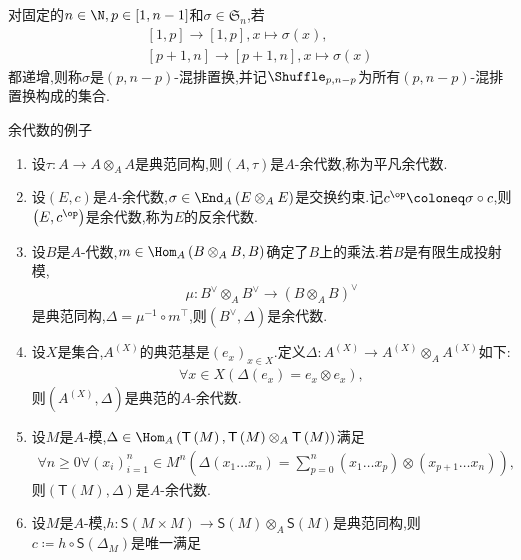 \begin{remark}{}{}
	对固定的$n\in\N,p\in\left[1,n-1\right]$和$\sigma\in\mathfrak{S}_{n}$,若
	\begin{gather*}
		\left[1,p\right]\to\left[1,p\right],x\mapsto\sigma\left(x\right),\\
		\left[p+1,n\right]\to\left[p+1,n\right],x\mapsto\sigma\left(x\right)
	\end{gather*}
	都递增,则称$\sigma$是$\left(p,n-p\right)$-混排置换,并记$\Shuffle_{p,n-p}$为所有$\left(p,n-p\right)$-混排置换构成的集合.
\end{remark}

\begin{example}{余代数的例子}{}
	\begin{enumerate}
		\item 设$\tau:A\to A\otimes_{A}A$是典范同构,则$\left(A,\tau\right)$是$A$-余代数,称为平凡余代数.
		\item 设$\left(E,c\right)$是$A$-余代数,$\sigma\in\End_{A}\left(E\otimes_{A}E\right)$是交换约束.记$c^{\op}\coloneq\sigma\circ c$,则$\left(E,c^{\op}\right)$是余代数,称为$E$的反余代数.
		\item 设$B$是$A$-代数,$m\in\Hom_{A}\left(B\otimes_{A}B,B\right)$确定了$B$上的乘法.若$B$是有限生成投射模,
		\begin{align*}
			\mu:B^{\vee}\otimes_{A}B^{\vee}\to\left(B\otimes_{A}B\right)^{\vee}
		\end{align*}
		是典范同构,$\Delta=\mu^{-1}\circ m^{\top}$,则$\left(B^{\vee},\Delta\right)$是余代数.
		\item 设$X$是集合,$A^{\left(X\right)}$的典范基是$\left(e_{x}\right)_{x\in X}$.定义$\Delta:A^{\left(X\right)}\to A^{\left(X\right)}\otimes_{A}A^{\left(X\right)}$如下:
		\begin{align*}
			\forall x\in X\left(\Delta\left(e_{x}\right)=e_{x}\otimes e_{x}\right),
		\end{align*}
		则$\left(A^{\left(X\right)},\Delta\right)$是典范的$A$-余代数.
		\item 设$M$是$A$-模,$\Delta\in\Hom_{A}\left(\mathsf{T}\left(M\right),\mathsf{T}\left(M\right)\otimes_{A}\mathsf{T}\left(M\right)\right)$满足
		\begin{align*}
			\forall n\geq 0\forall\left(x_{i}\right)_{i=1}^{n}\in M^{n}\left(\Delta\left(x_{1}\ldots x_{n}\right)=\sum\limits_{p=0}^{n}\left(x_{1}\ldots x_{p}\right)\otimes\left(x_{p+1}\ldots x_{n}\right)\right),
		\end{align*}
		则$\left(\mathsf{T}\left(M\right),\Delta\right)$是$A$-余代数.
		\item 设$M$是$A$-模,$h:\mathsf{S}\left(M\times M\right)\to\mathsf{S}\left(M\right)\otimes_{A}\mathsf{S}\left(M\right)$是典范同构,则$c\coloneq h\circ\mathsf{S}\left(\Delta_{M}\right)$是唯一满足

\end{enumerate}
\end{example}
